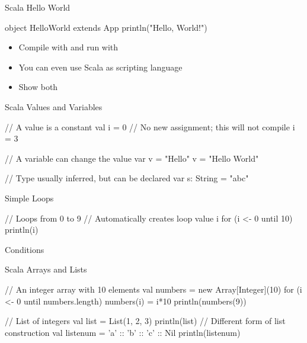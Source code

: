 \begin{frame}[fragile]{Scala Hello World}
\begin{chisel}
object HelloWorld extends App {
  println("Hello, World!")
}
\end{chisel}
\begin{itemize}
\item Compile with  and run with 
\item You can even use Scala as scripting language
\item Show both
\end{itemize}
\end{frame}


\begin{frame}[fragile]{Scala Values and Variables}
\begin{chisel}
// A value is a constant
val i = 0
// No new assignment; this will not compile
i = 3

// A variable can change the value
var v = "Hello"
v = "Hello World"

// Type usually inferred, but can be declared
var s: String = "abc"
\end{chisel}
\end{frame}

\begin{frame}[fragile]{Simple Loops}
\begin{chisel}
// Loops from 0 to 9
// Automatically creates loop value i
for (i <- 0 until 10) {
  println(i)
}
\end{chisel}
\end{frame}

\begin{frame}[fragile]{Conditions}
\end{frame}

\begin{frame}[fragile]{Scala Arrays and Lists}
\begin{chisel}
// An integer array with 10 elements
val numbers = new Array[Integer](10)
for (i <- 0 until numbers.length) {
  numbers(i) = i*10
}
println(numbers(9))


// List of integers
val list = List(1, 2, 3)
println(list)
// Different form of list construction
val listenum = 'a' :: 'b' :: 'c' :: Nil
println(listenum)
\end{chisel}
\end{frame}


